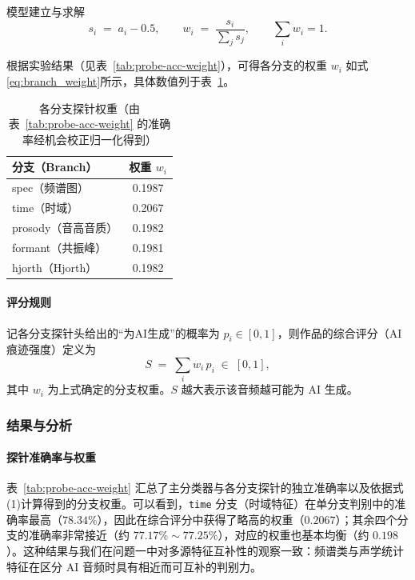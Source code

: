 \documentclass[aspectratio=169]{beamer}
\begin{document}
\begin{frame}{模型建立与求解}
\begin{equation}
    s_i \;=\; a_i - 0.5,\qquad 
    w_i \;=\; \frac{s_i}{\sum_j s_j},\qquad 
    \sum_i w_i = 1.
    \label{eq:branch_weight}
\end{equation}

根据实验结果（见表~\ref{tab:probe-acc-weight}），可得各分支的权重 $w_i$ 如式\ref{eq:branch_weight}所示，具体数值列于表~\ref{tab:branch-weights}。

\begin{table}[htbp]
\centering
\caption{各分支探针权重（由表~\ref{tab:probe-acc-weight} 的准确率经机会校正归一化得到）}
\label{tab:branch-weights}
\begin{tabular}{lc}
\toprule
分支（Branch） & 权重 $w_i$ \\
\midrule
spec（频谱图）      & 0.1987 \\
time（时域）        & 0.2067 \\
prosody（音高音质） & 0.1982 \\
formant（共振峰）   & 0.1981 \\
hjorth（Hjorth）    & 0.1982 \\
\bottomrule
\end{tabular}
\end{table}




\paragraph{评分规则} 记各分支探针头给出的“为AI生成”的概率为
$p_i\in[0,1]$，则作品的综合评分（AI痕迹强度）定义为
\begin{equation}
    S \;=\; \sum_{i} w_i\, p_i \;\in\;[0,1],
    \label{eq:ai_score}
\end{equation}
其中 $w_i$ 为上式确定的分支权重。$S$ 越大表示该音频越可能为 AI 生成。

\subsubsection{结果与分析}
\paragraph{探针准确率与权重} 表~\ref{tab:probe-acc-weight} 汇总了主分类器与各分支探针的独立准确率以及依据式(1)计算得到的分支权重。可以看到，\texttt{time} 分支（时域特征）在单分支判别中的准确率最高（$78.34\%$），因此在综合评分中获得了略高的权重（$0.2067$）；其余四个分支的准确率非常接近（约 $77.17\%\sim77.25\%$），对应的权重也基本均衡（约 $0.198$）。这种结果与我们在问题一中对多源特征互补性的观察一致：频谱类与声学统计特征在区分 AI 音频时具有相近而可互补的判别力。


\end{frame}
\end{document}
